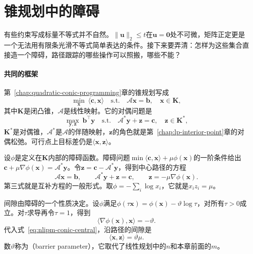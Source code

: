 \section{锥规划中的障碍}
\label{sec:nlipm-conic}

有些约束写成标量不等式并不自然。$\lVert\bm{u}\rVert_2\leq t$在$\bm{u}=\bm{0}$处不可微，矩阵正定更是一个无法用有限条光滑不等式简单表达的条件。接下来要弄清：怎样为这些集合直接造一个障碍，路径跟踪的哪些操作可以照搬，哪些不能？

\paragraph{共同的框架}
第~\ref{chap:quadratic-conic-programming}章的锥规划写成
\begin{equation}
 \min_{\bm{x}}\ \langle\bm{c},\bm{x}\rangle\quad\text{s.t.}\quad\mathcal{A}\bm{x}=\bm{b},\quad\bm{x}\in\bm{K},
 \label{eq:nlipm-conic-primal}
\end{equation}
其中$\bm{K}$是闭凸锥，$\mathcal{A}$是线性映射。它的对偶问题是
\begin{equation}
 \max_{\bm{y},\bm{z}}\ \bm{b}^\top\bm{y}\quad\text{s.t.}\quad\mathcal{A}^*\bm{y}+\bm{z}=\bm{c},\quad\bm{z}\in\bm{K}^*,
 \label{eq:nlipm-conic-dual}
\end{equation}
$\bm{K}^*$是对偶锥，$\mathcal{A}^*$是$\mathcal{A}$的伴随映射，$\bm{z}$的角色就是第~\ref{chap:lp-interior-point}章的对偶松弛。可行点上目标差仍是$\langle\bm{x},\bm{z}\rangle$。

设$\phi$是定义在$\bm{K}$内部的障碍函数。障碍问题$\min\langle\bm{c},\bm{x}\rangle+\mu\phi(\bm{x})$的一阶条件给出$\bm{c}+\mu\nabla\phi(\bm{x})=\mathcal{A}^*\bm{y}$。令$\bm{z}=\bm{c}-\mathcal{A}^*\bm{y}$，得到中心路径的方程
\begin{equation}
 \mathcal{A}\bm{x}=\bm{b},\qquad\mathcal{A}^*\bm{y}+\bm{z}=\bm{c},\qquad\bm{z}=-\mu\nabla\phi(\bm{x}).
 \label{eq:nlipm-conic-central}
\end{equation}
第三式就是互补方程的一般形式。取$\phi=-\sum_i\log x_i$，它就是$x_iz_i=\mu$。

间隙由障碍的一个性质决定。设$\phi$满足$\phi(\tau\bm{x})=\phi(\bm{x})-\vartheta\log\tau$，对所有$\tau>0$成立。对$\tau$求导再令$\tau=1$，得到
\[
 \langle\nabla\phi(\bm{x}),\bm{x}\rangle=-\vartheta.
\]
代入式~\eqref{eq:nlipm-conic-central}，沿路径的间隙是
\begin{equation}
 \langle\bm{x},\bm{z}\rangle=\vartheta\mu.
 \label{eq:nlipm-conic-gap}
\end{equation}
数$\vartheta$称为（barrier parameter），它取代了线性规划中的$n$和本章前面的$m$。

